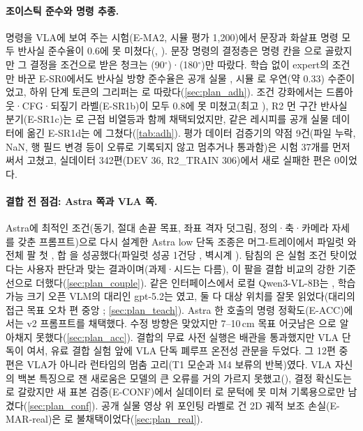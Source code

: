 \paragraph{조이스틱 준수와 명령 추종.} 명령을 VLA에 보여 주는 시험(E-MA2, 시뮬 평가 1,200)에서 문장과 화살표 명령 모두 반사실 준수율이 0.6에 못 미쳤다(, ). 문장 명령의 결정층은 명령 칸을 으로 골랐지만 그 결정을 조건으로 받은 청크는 (90$^\circ$)·(180$^\circ$)만 따랐다. 학습 없이 expert의 조건만 바꾼 E-SR0에서도 반사실 방향 준수율은 공개 실물 , 시뮬 로 우연(약 0.33) 수준이었고, 하위 단계 토큰의 그리퍼는 로 따랐다(\cref{sec:plan_adh}). 조건 강화에서는 드롭아웃·CFG·되짚기 라벨(E-SR1b)이 모두 0.8에 못 미쳤고(최고 ), R2 먼 구간 반사실 분기(E-SR1c)는 로 근접 비열등과 함께 채택되었지만, 같은 레시피를 공개 실물 데이터에 옮긴 E-SR1d는 에 그쳤다(\cref{tab:adh}). 평가 데이터 검증기의 약점 9건(파일 누락, NaN, 행 필드 변경 등이 오류로 기록되지 않고 멈추거나 통과함)은 시험 37개를 먼저 써서 고쳤고, 실데이터 342편(DEV 36, R2\_TRAIN 306)에서 새로 실패한 편은 0이었다.

\paragraph{결합 전 점검: Astra 쪽과 VLA 쪽.} Astra에 최적인 조건(동기, 절대 손끝 목표, 좌표 격자 덧그림, 정의·축·카메라 자세를 갖춘 프롬프트)으로 다시 설계한 Astra low 단독 조종은 머그-트레이에서 파일럿 와 전체 팔 첫 , 합 을 성공했다(파일럿 성공 1건당 , 벽시계 ). 탐침의 은 실험 조건 탓이었다는 사용자 판단과 맞는 결과이며(과제·시드는 다름), 이 팔을 결합 비교의 강한 기준선으로 더했다(\cref{sec:plan_couple}). 같은 인터페이스에서 로컬 Qwen3-VL-8B는 , 학습 가능 크기 오픈 VLM의 대리인 gpt-5.2는 였고, 둘 다 대상 위치를 잘못 읽었다(대리의 접근 목표 오차 편 중앙 ; \cref{sec:plan_teach}). Astra 한 호출의 명령 정확도(E-ACC)에서는 v2 프롬프트를 채택했다. 수정 방향은  맞았지만 7--10\,cm 목표 어긋남은 으로 알아채지 못했다(\cref{sec:plan_acc}). 결합의 무료 사전 실행은 배관을 통과했지만 VLA 단독이 여서, 유료 결합 실험 앞에 VLA 단독 폐루프 온전성 관문을 두었다. 그 12편 중 편은 VLA가 아니라 런타임의 멈춤 고리(T1 모순과 M4 보류의 반복)였다. VLA 자신의 백본 특징으로 잰 새로움은 모델의 큰 오류를 거의 가르지 못했고(), 결정 확신도는 로 갈랐지만 새 표본 검증(E-CONF)에서 실데이터 로 문턱에 못 미쳐 기록용으로만 남겼다(\cref{sec:plan_conf}). 공개 실물 영상 위 포인팅 라벨로 건 2D 궤적 보조 손실(E-MAR-real)은 로 불채택이었다(\cref{sec:plan_real}).

